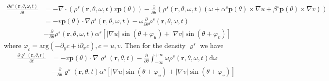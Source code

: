 \documentclass{article}
\begin{document}
\begin{enumerate}
    \begin{equation}
        \begin{aligned}
            \frac{\partial \rho ^s\left( \mathbf{r},\theta ,\omega ,t \right)}{\partial t}&=-\nabla \cdot \left( \rho ^s\left( \mathbf{r},\theta ,\omega ,t \right) v\mathbf{p}\left( \theta \right) \right) -\frac{\partial}{\partial \theta}\left( \rho ^s\left( \mathbf{r},\theta ,\omega ,t \right) \left( \omega +\alpha ^s\mathbf{p}\left( \theta \right) \times \nabla u+\beta ^s\mathbf{p}\left( \theta \right) \times \nabla v \right) \right)\\
            &=-v\mathbf{p}\left( \theta \right) \cdot \nabla \rho ^s\left( \mathbf{r},\theta ,\omega ,t \right) -\omega \frac{\partial}{\partial \theta}\rho ^s\left( \mathbf{r},\theta ,\omega ,t \right)\\
            &-\frac{\partial}{\partial \theta}\rho ^s\left( \mathbf{r},\theta ,\omega ,t \right) \alpha ^s\left[ \left| \nabla u \right|\sin \left( \theta +\varphi _u \right) +\left| \nabla v \right|\sin \left( \theta +\varphi _v \right) \right]
        \end{aligned}
    \end{equation}
    where $\varphi _c=\mathrm{arg}\left( -\partial _yc+\mathrm{i}\partial _xc \right) , c=u, v$. Then for the density $\varrho ^s$ we have
    \begin{equation}
        \label{eq:coarseDensityChemotactic}
        \begin{aligned}
            \frac{\partial \varrho ^s\left( \mathbf{r},\theta ,t \right)}{\partial t}&=-v\mathbf{p}\left( \theta \right) \cdot \nabla \varrho ^s\left( \mathbf{r},\theta ,t \right) -\frac{\partial}{\partial \theta}\int_{-\infty}^{+\infty}{\omega \rho ^s\left( \mathbf{r},\theta ,\omega ,t \right) \mathrm{d}\omega}\\
            &-\frac{\partial}{\partial \theta}\varrho ^s\left( \mathbf{r},\theta ,t \right) \alpha ^s\left[ \left| \nabla u \right|\sin \left( \theta +\varphi _u \right) +\left| \nabla v \right|\sin \left( \theta +\varphi _v \right) \right]\\
        \end{aligned}
    \end{equation}
\end{enumerate}

\end{document}

